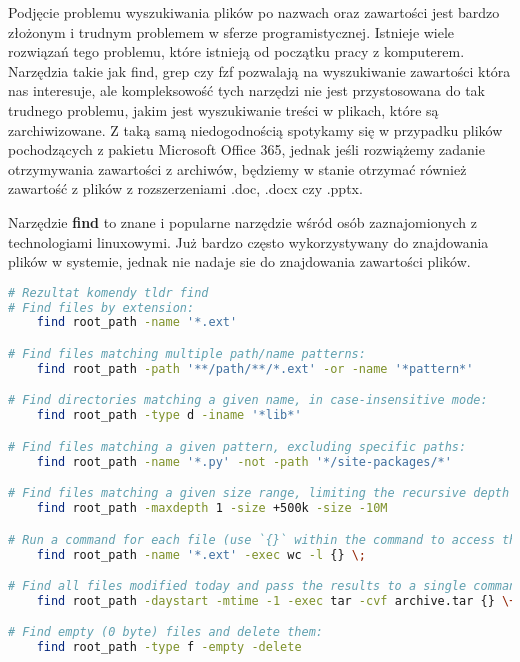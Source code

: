 Podjęcie problemu wyszukiwania plików po nazwach oraz zawartości jest bardzo
złożonym i trudnym problemem w sferze programistycznej. Istnieje wiele rozwiązań
tego problemu, które istnieją od początku pracy z komputerem. Narzędzia takie
jak find, grep czy fzf pozwalają na wyszukiwanie zawartości która nas interesuje,
ale kompleksowość tych narzędzi nie jest przystosowana do tak trudnego problemu,
jakim jest wyszukiwanie treści w plikach, które są zarchiwizowane. Z taką samą
niedogodnością spotykamy się w przypadku plików pochodzących z pakietu Microsoft
Office 365, jednak jeśli rozwiążemy zadanie otrzymywania zawartości z archiwów,
będziemy w stanie otrzymać również zawartość z plików z rozszerzeniami .doc,
.docx czy .pptx.

Narzędzie \textbf{find} to znane i popularne narzędzie wśród osób zaznajomionych z
technologiami linuxowymi. Już bardzo często wykorzystywany do znajdowania plików
w systemie, jednak nie nadaje sie do znajdowania zawartości plików.

\begin{lstlisting}[language=bash]
# Rezultat komendy tldr find
# Find files by extension:
    find root_path -name '*.ext'

# Find files matching multiple path/name patterns:
    find root_path -path '**/path/**/*.ext' -or -name '*pattern*'

# Find directories matching a given name, in case-insensitive mode:
    find root_path -type d -iname '*lib*'

# Find files matching a given pattern, excluding specific paths:
    find root_path -name '*.py' -not -path '*/site-packages/*'

# Find files matching a given size range, limiting the recursive depth to "1":
    find root_path -maxdepth 1 -size +500k -size -10M

# Run a command for each file (use `{}` within the command to access the filename):
    find root_path -name '*.ext' -exec wc -l {} \;

# Find all files modified today and pass the results to a single command as arguments:
    find root_path -daystart -mtime -1 -exec tar -cvf archive.tar {} \+

# Find empty (0 byte) files and delete them:
    find root_path -type f -empty -delete
\end{lstlisting}

